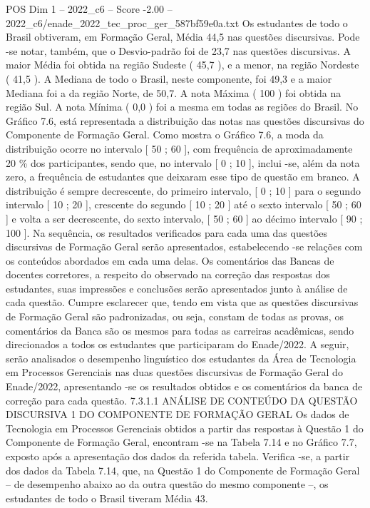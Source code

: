 \begin{textsample}{POS Dim 1 – 2022\_c6 – Score -2.00 – 2022\_c6/enade\_2022\_tec\_proc\_ger\_587bf59e0a.txt}
Os estudantes de todo o Brasil obtiveram, em Formação Geral, Média 44,5 nas questões discursivas.
Pode -se notar, também, que o Desvio-padrão foi de 23,7 nas questões discursivas.
A maior Média foi obtida na região Sudeste ( 45,7 ), e a menor, na região Nordeste ( 41,5 ).
A Mediana de todo o Brasil, neste componente, foi 49,3 e a maior Mediana foi a da região Norte, de 50,7.
A nota Máxima ( 100 ) foi obtida na região Sul.
A nota Mínima ( 0,0 ) foi a mesma em todas as regiões do Brasil.
No Gráfico 7.6, está representada a distribuição das notas nas questões discursivas do Componente de Formação Geral.
Como mostra o Gráfico 7.6, a moda da distribuição ocorre no intervalo [ 50 ; 60 ], com frequência de aproximadamente 20 \% dos participantes, sendo que, no intervalo [ 0 ; 10 ], inclui -se, além da nota zero, a frequência de estudantes que deixaram esse tipo de questão em branco.
A distribuição é sempre decrescente, do primeiro intervalo, [ 0 ; 10 ] para o segundo intervalo [ 10 ; 20 ], crescente do segundo [ 10 ; 20 ] até o sexto intervalo [ 50 ; 60 ] e volta a ser decrescente, do sexto intervalo, [ 50 ; 60 ] ao décimo intervalo [ 90 ; 100 ].
Na sequência, os resultados verificados para cada uma das questões discursivas de Formação Geral serão apresentados, estabelecendo -se relações com os conteúdos abordados em cada uma delas.
Os comentários das Bancas de docentes corretores, a respeito do observado na correção das respostas dos estudantes, suas impressões e conclusões serão apresentados junto à análise de cada questão.
Cumpre esclarecer que, tendo em vista que as questões discursivas de Formação Geral são padronizadas, ou seja, constam de todas as provas, os comentários da Banca são os mesmos para todas as carreiras acadêmicas, sendo direcionados a todos os estudantes que participaram do Enade/2022.
A seguir, serão analisados o desempenho linguístico dos estudantes da Área de Tecnologia em Processos Gerenciais nas duas questões discursivas de Formação Geral do Enade/2022, apresentando -se os resultados obtidos e os comentários da banca de correção para cada questão. 7.3.1.1 ANÁLISE DE CONTEÚDO DA QUESTÃO DISCURSIVA 1 DO COMPONENTE DE FORMAÇÃO GERAL Os dados de Tecnologia em Processos Gerenciais obtidos a partir das respostas à Questão 1 do Componente de Formação Geral, encontram -se na Tabela 7.14 e no Gráfico 7.7, exposto após a apresentação dos dados da referida tabela.
Verifica -se, a partir dos dados da Tabela 7.14, que, na Questão 1 do Componente de Formação Geral – de desempenho abaixo ao da outra questão do mesmo componente –, os estudantes de todo o Brasil tiveram Média 43.

\end{textsample}
